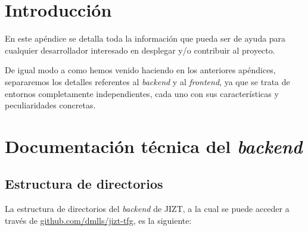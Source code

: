  \label{apendice:programador}

\section{Introducción}

En este apéndice se detalla toda la información que pueda ser de ayuda para cualquier desarrollador interesado en desplegar y/o contribuir al proyecto.

De igual modo a como hemos venido haciendo en los anteriores apéndices, separaremos los detalles referentes al \emph{backend} y al \emph{frontend}, ya que se trata de entornos completamente independientes, cada uno con sus características y peculiaridades concretas.

\section{Documentación técnica del \emph{backend}}


\subsection{Estructura de directorios}

La estructura de directorios del \emph{backend} de JIZT, a la cual se puede acceder a través de \href{https://github.com/dmlls/jizt-tfg}{github.com/dmlls/jizt-tfg}, es la siguiente:

